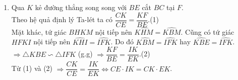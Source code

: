 \begin{ex}
{\begin{enumerate}
{
}
Suy ra $\widehat{BKH}=\widehat{BCK}$, mà $\widehat{BCK}=\widehat{BMH}$ (cùng phụ với $\widehat{CBM}$). Do đó trong tứ giác $BHKM$ có $\widehat{BKH}=\widehat{BMH}$, mà $\widehat{BKH}$, $\widehat{BMH}$ cùng nhìn cạnh $BH$ nên $BHKM$ là tứ giác nội tiếp.\\
Suy ra $\widehat{MKB}=\widehat{MHB}=90^\circ$ hay $BK\perp MK$. Vậy $MK$ là tiếp tuyến của $(B,BD)$.
\item Qua $K$ kẻ đường thẳng song song với $BE$ cắt $BC$ tại $F$.\\ Theo hệ quả định lý Ta-lét ta có $\dfrac{CK}{CE}=\dfrac{KF}{BE}$.\hfill (1)\\
Mặt khác, tứ giác $BHKM$ nội tiếp nên $\widehat{KHM}=\widehat{KBM}$. Cũng có tứ giác $HFKI$ nội tiếp nên $\widehat{KHI}=\widehat{IFK}$. Do đó $\widehat{KBM}=\widehat{IFK}$ hay $\widehat{KBE}=\widehat{IFK}$.\\
$\Rightarrow\triangle KBE\backsim \triangle IFK$ (g.g)
$\Rightarrow\dfrac{KF}{BE}=\dfrac{IK}{EK}$.\hfill (2)\\
Từ (1) và (2) $\Rightarrow\dfrac{CK}{CE}=\dfrac{IK}{EK}\Leftrightarrow CE\cdot IK=CK\cdot EK$.
\end{enumerate}
}
\end{ex}
